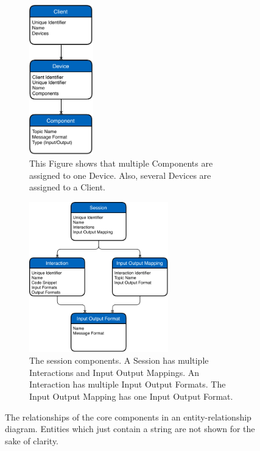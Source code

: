 \begin{figure}[H]
	\centering
	\begin{subfigure}[t]{.48\textwidth}
		\centering
		\includegraphics[height=6.5cm]{figures/implementation/ubii_er_client.pdf}
		\caption{This Figure shows that multiple Components are assigned to one Device. Also, several Devices are assigned to a Client.}\label{fig:ubii-er-client}
  \end{subfigure}%
  \hspace{0.04\textwidth}%
	\begin{subfigure}[t]{.48\textwidth}
		\centering
		\includegraphics[height=6.5cm]{figures/implementation/ubii_er_server.pdf}
		\caption{The session components. A Session has multiple Interactions and Input Output Mappings. An Interaction has multiple Input Output Formats. The Input Output Mapping has one Input Output Format.}\label{fig:ubii-er-server}
	\end{subfigure}
	\caption[UBII components diagram]{The relationships of the core components in an entity-relationship diagram. Entities which just contain a string are not shown for the sake of clarity.}\label{fig:ubii-er}
\end{figure}


